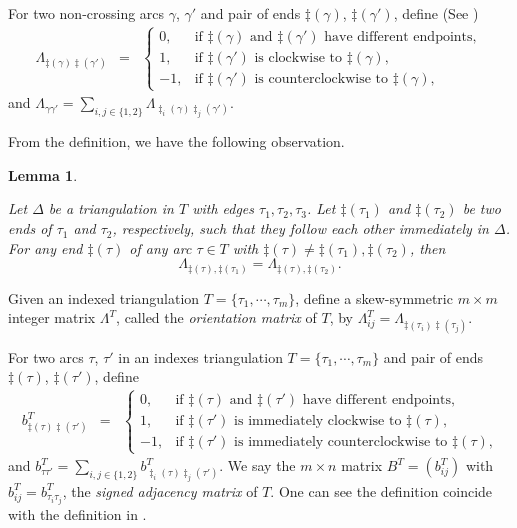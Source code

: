 \documentclass[10pt]{amsart}
\theoremstyle{theorems}
\newtheorem{Lemma}[Theorem]{Lemma}
\begin{document}
For two non-crossing arcs $\gamma$, $\gamma'$ and pair of ends $\ddag(\gamma)$, $\ddag(\gamma')$, define (See \cite{M})
\[\begin{array}{ccl} \Lambda_{\ddag(\gamma)\ddag(\gamma')} &=&
         \left\{\begin{array}{ll}
              0, &\mbox{if $\ddag(\gamma)$ and $\ddag(\gamma')$ have different endpoints},  \\
              1,  &\mbox{if $\ddag(\gamma')$ is clockwise to $\ddag(\gamma)$}, \\
              -1, &\mbox{if $\ddag(\gamma')$ is counterclockwise to $\ddag(\gamma)$},
         \end{array}\right.
 \end{array}\]
and $\Lambda_{\gamma\gamma'}=\sum_{i,j\in\{1,2\}}\Lambda_{\ddag_i(\gamma)\ddag_j(\gamma')}$.

\medskip

From the definition, we have the following observation.

\medskip

\begin{Lemma}\label{basiclam}

Let $\Delta$ be a triangulation in $T$ with edges $\tau_1,\tau_2,\tau_3$. Let $\ddag(\tau_1)$ and $\ddag(\tau_2)$ be two ends of $\tau_1$ and $\tau_2$, respectively, such that they follow each other immediately in $\Delta$. For any end $\ddag(\tau)$ of any arc $\tau\in T$ with $\ddag(\tau)\neq \ddag(\tau_1),\ddag(\tau_2)$, then
$$\Lambda_{\ddag(\tau),\ddag(\tau_1)}=\Lambda_{\ddag(\tau),\ddag(\tau_2)}.$$

\end{Lemma}

\medskip

Given an indexed triangulation $T=\{\tau_1,\cdots,\tau_m\}$, define a skew-symmetric $m\times m$ integer matrix $\Lambda^T$, called the \emph{orientation matrix} of $T$, by $\Lambda^T_{ij}=\Lambda_{\ddag(\tau_i)\ddag(\tau_j)}$.

\medskip

For two arcs $\tau$, $\tau'$ in an indexes triangulation $T=\{\tau_1,\cdots,\tau_m\}$ and pair of ends $\ddag(\tau)$, $\ddag(\tau')$, define
\[\begin{array}{ccl} b^{T}_{\ddag(\tau)\ddag(\tau')} &=&
         \left\{\begin{array}{ll}
              0, &\mbox{if $\ddag(\tau)$ and $\ddag(\tau')$ have different endpoints},  \\
              1, &\mbox{if $\ddag(\tau')$ is immediately clockwise to $\ddag(\tau)$}, \\
              -1, &\mbox{if $\ddag(\tau')$ is immediately counterclockwise to $\ddag(\tau)$,}
         \end{array}\right.
 \end{array}\]
and $b^T_{\tau\tau'}=\sum\limits_{i,j\in\{1,2\}}b^T_{\ddag_i(\tau)\ddag_j(\tau')}$.
We say the $m\times n$ matrix $B^T=(b^T_{ij})$ with $b^T_{ij}=b^T_{\tau_i\tau_j}$, the \emph{signed adjacency matrix} of $T$. One can see the definition coincide with the definition in \cite{FST3}.
\end{document}
